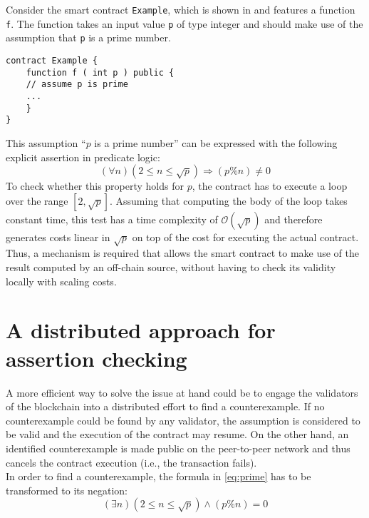 Consider the smart contract \texttt{Example}, which is shown in  and features a function \texttt{f}. The function takes an input value \texttt{p} of type integer and should make use of the assumption that \texttt{p} is a prime number.
\begin{lstlisting}[caption=Smart contract with a function that expects a prime number \cite{thiemann_2020}, numbers=none, language=Solidity, label=lst:prime]
contract Example {
	function f ( int p ) public {
	// assume p is prime
	...
	}
}
\end{lstlisting}
This assumption ``$p$ is a prime number'' can be expressed with the following explicit assertion in predicate logic: 
\begin{equation}\label{eq:prime}
    (\forall n) (2 \le n \le \sqrt{p}) \Rightarrow (p \% n) \neq 0
\end{equation}
To check whether this property holds for $p$, the contract has to execute a loop over the range $[2, \sqrt{p}]$. Assuming that computing the body of the loop takes constant time, this test has a time complexity of $\mathcal{O}(\sqrt{p})$ and therefore generates costs linear in $\sqrt{p}$ on top of the cost for executing the actual contract. Thus, a mechanism is required that allows the smart contract to make use of the result computed by an off-chain source, without having to check its validity locally with scaling costs.

\section{A distributed approach for assertion checking}
A more efficient way to solve the issue at hand could be to engage the validators of the blockchain into a distributed effort to find a counterexample. If no counterexample could be found by any validator, the assumption is considered to be valid and the execution of the contract may resume. On the other hand, an identified counterexample is made public on the peer-to-peer network and thus cancels the contract execution (i.e., the transaction fails). \\
In order to find a counterexample, the formula in \eqref{eq:prime} has to be transformed to its negation:
\begin{equation}\label{eq:prime_neg}
	(\exists n) (2 \le n \le \sqrt{p}) \wedge (p \% n) = 0
\end{equation}

